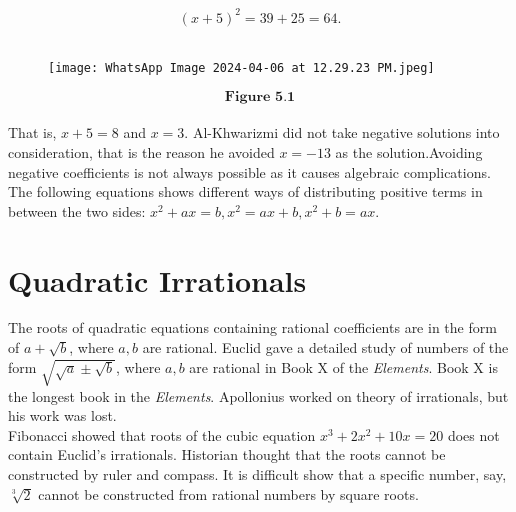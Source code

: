 \documentclass[a4paper,reqno,11pt]{amsart}
\theoremstyle{plain}%
\theoremstyle{definition}
\theoremstyle{remark}
\begin{document}
$$(x + 5)^2 =39 + 25 =64.$$
\\
\begin{figure}
\texttt{[image: WhatsApp Image 2024-04-06 at 12.29.23 PM.jpeg]}
\end{figure}
$$\textbf{Figure 5.1}$$
\\
That is, $x+5 = 8$ and $x = 3.$ Al-Khwarizmi did not take negative solutions into consideration, that is the reason he avoided $x = -13$ as the solution.Avoiding negative coefficients is not always possible as it causes algebraic complications. The following equations shows different ways of distributing positive terms in between the two sides: $x^2 + ax = b, x^2 = ax + b,
x^2 + b = ax.$\\
\section{Quadratic Irrationals}
The roots of quadratic equations containing rational coefficients are in the form of $a + \sqrt{b}$, where $a, b$ are rational. Euclid gave a detailed study of numbers of the form $\sqrt{\sqrt{a}\pm\sqrt{b}}$, where $a,b$ are rational in Book X of the \textit{Elements}. Book X is
the longest book in the \textit{Elements}. Apollonius worked on theory of irrationals, but his work was lost.\\
\indent Fibonacci showed that roots of the cubic equation $x^3 + 2x^2 + 10x = 20$ does not contain Euclid’s irrationals. Historian thought that the roots cannot be constructed by ruler and compass. It is difficult show that a specific number, say, $\sqrt[3]{2}$ cannot be constructed from rational numbers by square roots.\\
\\
\end{document}
